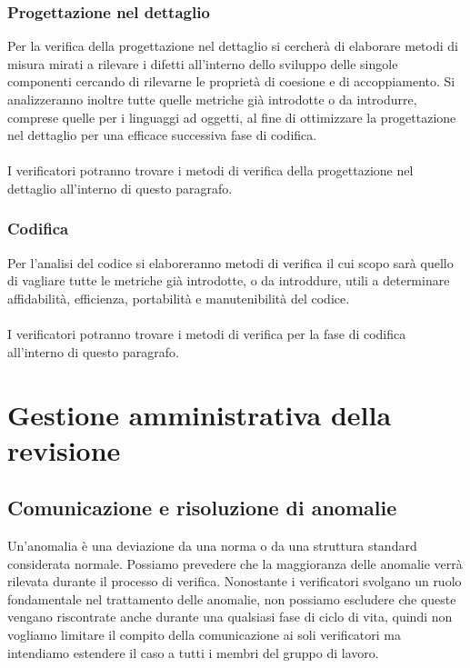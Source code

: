 \subsection{Progettazione nel dettaglio}

Per la verifica della progettazione nel dettaglio si cercher\`a di elaborare 
metodi di misura mirati a rilevare i difetti all'interno dello sviluppo delle
singole componenti cercando di rilevarne le propriet\`a di coesione e di
accoppiamento. Si analizzeranno inoltre tutte quelle metriche gi\`a introdotte o
da introdurre, comprese quelle per i linguaggi ad oggetti, al fine di
ottimizzare la progettazione nel dettaglio per una efficace successiva fase di
codifica.
\\\\
I verificatori potranno trovare i metodi di verifica della
progettazione nel dettaglio all'interno di questo paragrafo.

\subsection{Codifica}

Per l'analisi del codice si elaboreranno metodi di verifica il cui scopo sar\`a
quello di vagliare tutte le metriche gi\`a introdotte, o da introddure, utili a
determinare affidabilit\`a, efficienza, portabilit\`a e manutenibilit\`a del codice.
\\\\
I verificatori potranno trovare i metodi di verifica per la fase di codifica
all'interno di questo paragrafo.


\chapter{Gestione amministrativa della \\revisione}
\thispagestyle{fancy} %

\section{Comunicazione e risoluzione di anomalie}

Un'anomalia \`e una deviazione da una norma o da una struttura standard
considerata normale. Possiamo prevedere che la maggioranza delle anomalie verr\`a 
rilevata durante il processo di verifica. Nonostante i verificatori svolgano un
ruolo fondamentale nel trattamento delle anomalie, non possiamo escludere che
queste vengano riscontrate anche durante una qualsiasi fase di ciclo di vita,
quindi non vogliamo limitare il compito della comunicazione ai soli verificatori ma 
intendiamo estendere il caso a tutti i membri del gruppo di lavoro.

